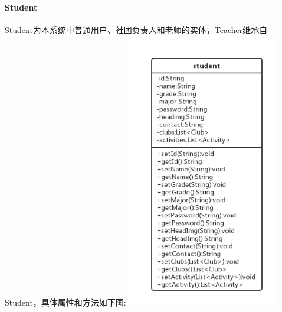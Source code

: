 \documentclass[UTF8]{ctexart}
\begin{document}
\paragraph{Student}
Student为本系统中普通用户、社团负责人和老师的实体，Teacher继承自Student，具体属性和方法如下图:
\newline
\includegraphics[width = 0.5\textwidth]{student-class.png}
\newline
\end{document}
